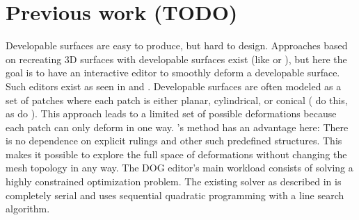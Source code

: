 \documentclass[a4paper,twoside,12pt,nochapterprefix]{scrbook}
\begin{document}
\section{Previous work (TODO)}\label{sec:prev_work}
Developable surfaces are easy to produce, but hard to design. Approaches based on recreating 3D surfaces with developable surfaces exist (like \cite{liu_et_al} or \cite{kilian-2008-cf}), but here the goal is to have an interactive editor to smoothly deform a developable surface. Such editors exist as seen in \cite{bo_et_al} and \cite{tang_et_al}. Developable surfaces are often modeled as a set of patches where each patch is either planar, cylindrical, or conical (\cite{bo_et_al} do this, as do \cite{kilian-2008-cf}). This approach leads to a limited set of possible deformations because each patch can only deform in one way. \cite{Rabinovich:DogNets:2018}'s method has an advantage here: There is no dependence on explicit rulings and other such predefined structures. This makes it possible to explore the full space of deformations without changing the mesh topology in any way.\newline
The DOG editor's main workload consists of solving a highly constrained optimization problem. The existing solver as described in \cite{Rabinovich:CurvedFolds:2019} is completely serial and uses sequential quadratic programming with a line search algorithm.



\end{document}
